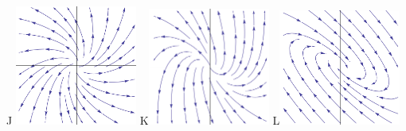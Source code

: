 \documentclass[epsf]{article}
\begin{document}
\begin{center}
\vskip 1cm
J \includegraphics[width=40mm]{spiral_source.png}\hspace{0.6 cm} K\includegraphics[width=40mm]{spiral_source2.png}\hspace{0.6 cm} L\includegraphics[width=40mm]{stable_spiral2.png}\\
\end{center}
\end{document}
